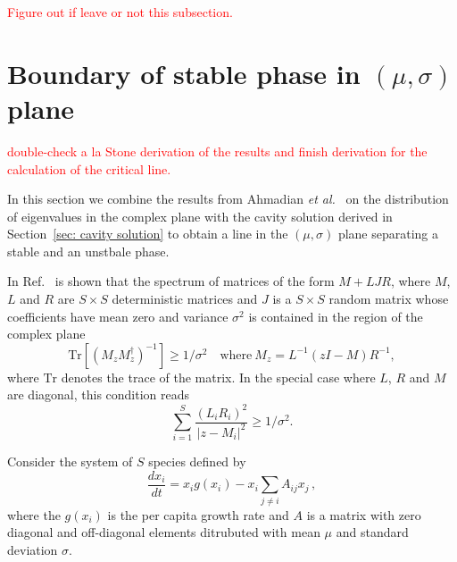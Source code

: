 \documentclass[10pt]{article}
\begin{document}
\textcolor{red}{Figure out if leave or not this subsection.}


\section{Boundary of stable phase in $(\mu, \sigma)$ plane}
\textcolor{red}{double-check a la Stone 
derivation of the results and finish derivation for the
calculation of the critical line.}

In this section we combine the results from Ahmadian \emph{et al.}~\cite{Ahmadian2015} 
on the distribution of eigenvalues
in the complex plane with the cavity solution derived in 
Section~\ref{sec: cavity solution} to obtain a line in the $(\mu, \sigma)$
plane separating a stable and an unstbale phase.

In Ref.~\cite{Ahmadian2015} is shown that the spectrum of matrices of the form 
$M + LJR$, where $M$,  $L$ and $R$ are $S\times S$ deterministic matrices and $J$ 
is a $S\times S$ random matrix whose coefficients have mean zero and variance $\sigma^2$ 
is contained in the region of the complex plane 
\begin{equation}
    \textrm{Tr}[(M_zM_z^\dagger)^{-1}]\geq 1/\sigma^2 \quad \textrm{where}\ M_z = L^{-1}(zI - M)R^{-1}, 
\end{equation}
where $\textrm{Tr}$ denotes the trace of the matrix. In the special case where 
$L$, $R$ and $M$ are diagonal, this condition reads
\begin{equation}
    \sum_{i=1}^S\frac{(L_{i}R_{i})^2}{ \vert z - M_{i}\vert^2 }\geq 1/\sigma^2.
\end{equation}

Consider the system of $S$ species defined by
\begin{equation}
    \frac{dx_i}{dt} = x_ig(x_i) - x_i\sum_{j\neq i}A_{ij}x_j \, ,
\end{equation}
where the $g(x_i)$ is the per capita growth rate and $A$ is a matrix with
zero diagonal and off-diagonal elements
ditrubuted with mean $\mu$ and standard deviation $\sigma$.
\end{document}
